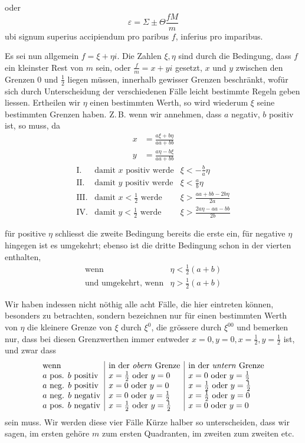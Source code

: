 oder
\[
\varepsilon=\Sigma\pm\Theta\frac{fM}{m}
\]
ubi signum superius accipiendum pro paribus $f$, inferius pro imparibus.

Es sei nun allgemein $f=\xi+\eta i$. Die Zahlen $\xi,\eta$ sind durch die Bedingung, dass $f$ ein kleinster Rest von $m$ sein, oder $\frac{f}{m}=x+yi$ gesetzt, $x$ und $y$ zwischen den Grenzen $0$ und $\frac12$ liegen müssen, innerhalb gewisser Grenzen beschränkt, wofür sich durch Unterscheidung der verschiedenen Fälle leicht bestimmte Regeln geben liessen. Ertheilen wir $\eta$ einen bestimmten Werth, so wird wiederum $\xi$ seine bestimmten Grenzen haben. Z.\,B. wenn wir annehmen, dass $a$ negativ, $b$ positiv ist, so muss, da
\[
\begin{aligned}
x&=\frac{a\xi+b\eta}{aa+bb}\\
y&=\frac{a\eta-b\xi}{aa+bb}
\end{aligned}
\]
\[
\begin{array}{rll}
\mathrm{I.}&\text{damit }x\text{ positiv werde}&\xi<-\frac{b}{a}\eta\\[3pt]
\mathrm{II.}&\text{damit }y\text{ positiv werde}&\xi<\frac{a}{b}\eta\\[3pt]
\mathrm{III.}&\text{damit }x<\frac12\text{ werde}&\xi>\frac{aa+bb-2b\eta}{2a}\\[3pt]
\mathrm{IV.}&\text{damit }y<\frac12\text{ werde}&\xi>\frac{2a\eta-aa-bb}{2b}
\end{array}
\]

für positive $\eta$ schliesst die zweite Bedingung bereits die erste ein, für negative $\eta$ hingegen ist es umgekehrt; ebenso ist die dritte Bedingung schon in der vierten enthalten,
\[
\begin{array}{ll}
\text{wenn}&\eta<\tfrac12(a+b)\\
\text{und umgekehrt, wenn}&\eta>\tfrac12(a+b)
\end{array}
\]

Wir haben indessen nicht nöthig alle acht Fälle, die hier eintreten können, besonders zu betrachten, sondern bezeichnen nur für einen bestimmten Werth von $\eta$ die kleinere Grenze von $\xi$ durch $\xi^0$, die grössere durch $\xi^{00}$ und bemerken nur, dass bei diesen Grenzwerthen immer entweder $x=0,y=0,x=\frac12,y=\frac12$ ist, und zwar dass
\[
\begin{array}{l|l|l}
\text{wenn}&\text{in der \emph{obern} Grenze}&\text{in der \emph{untern} Grenze}\\
a\text{ pos. }b\text{ positiv}&x=\frac12\text{ oder }y=0&x=0\text{ oder }y=\frac12\\
a\text{ neg. }b\text{ positiv}&x=0\text{ oder }y=0&x=\frac12\text{ oder }y=\frac12\\
a\text{ neg. }b\text{ negativ}&x=0\text{ oder }y=\frac12&x=\frac12\text{ oder }y=0\\
a\text{ pos. }b\text{ negativ}&x=\frac12\text{ oder }y=\frac12&x=0\text{ oder }y=0
\end{array}
\]
sein muss. Wir werden diese vier Fälle Kürze halber so unterscheiden, dass wir sagen, im ersten gehöre $m$ zum ersten Quadranten, im zweiten zum zweiten etc.

